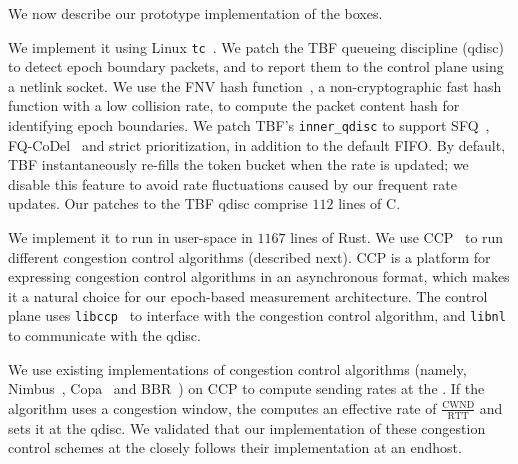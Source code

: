 We now describe our prototype implementation of the \name boxes.

 We implement it using Linux \texttt{tc}~\cite{tc}.
We patch the TBF queueing discipline (qdisc)~\cite{tbf} to detect epoch boundary packets, and to report them to the control plane using a netlink socket. We use the FNV hash function~\cite{fnv-hash}, a non-cryptographic fast hash function with a low collision rate, to compute the packet content hash for identifying epoch boundaries.
We patch TBF's \texttt{inner\_qdisc} to support SFQ~\cite{sfq}, FQ-CoDel~\cite{fq-codel} and strict prioritization, in addition to the default FIFO. 
By default, TBF instantaneously re-fills the token bucket when the rate is updated; we disable this feature to avoid rate fluctuations caused by our frequent rate updates. 
Our patches to the TBF qdisc comprise $112$ lines of C.

 We implement it to run in user-space in $1167$ lines of Rust.
We use CCP~\cite{ccp} to run different congestion control algorithms (described next). CCP is a platform for expressing congestion control algorithms in an asynchronous format, which makes it a natural choice for our epoch-based measurement architecture. The control plane uses \texttt{libccp}~\cite{ccp} to interface with the congestion control algorithm, and  \texttt{libnl} to communicate with the qdisc.

 We use existing implementations of congestion control algorithms (namely, Nimbus~\cite{nimbus}, Copa~\cite{copa} and BBR~\cite{bbr}) on CCP to compute sending rates at the \inbox.  If the algorithm uses a congestion window, the \inbox computes an effective rate of $\frac{\text{CWND}}{\text{RTT}}$ and sets it at the qdisc. 
We validated that our implementation of these congestion control schemes at the \inbox closely follows their implementation at an endhost.


